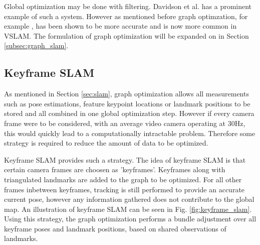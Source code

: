 Global optimization may be done with filtering.  Davidson et al.\cite{davison_03} has a prominent example of such a system.  However as mentioned before graph optimzation, for example \cite{ptam}, has been shown to be more accurate and is now more common in VSLAM.  The formulation of graph optimization will be expanded on in Section \ref{subsec:graph_slam}.

\subsection{Keyframe SLAM}

As mentioned in Section \ref{sec:slam}, graph optimization allows all measurements such as pose estimations, feature keypoint locations or landmark positions to be stored and all combined in one global optimization step.  However if every camera frame were to be considered, with an average video camera operating at 30Hz, this would quickly lead to a computationally intractable problem.  Therefore some strategy is required to reduce the amount of data to be optimized.

Keyframe SLAM provides such a strategy.  The idea of keyframe SLAM is that certain camera frames are choosen as 'keyframes'.  Keyframes along with triangulated landmarks are added to the graph to be optimized.  For all other frames inbetween keyframes, tracking is still performed to provide an accurate current pose, however any information gathered does not contribute to the global map.  An illustration of keyframe SLAM can be seen in Fig. \ref{fig:keyframe_slam}.  Using this strategy, the graph optimization performs a bundle adjustment over all keyframe poses and landmark positions, based on shared observations of landmarks. 

